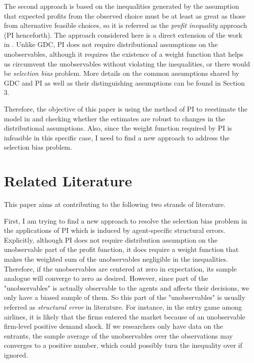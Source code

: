 \documentclass[a4paper]{article}
\begin{document}
The second approach is based on the inequalities generated by the assumption that expected profits from the observed choice must be at least as great as those from alternative feasible choices, so it is referred as the \textit{profit inequality} approach (PI henceforth). The approach considered here is a direct extension of the work in \cite{pakes2015moment}. Unlike GDC, PI does not require distributional assumptions on the unobservables, although it requires the existence of a weight function that helps us circumvent the unobservables without violating the inequalities, or there would be \textit{selection bias} problem. More details on the common assumptions shared by GDC and PI as well as their distinguishing assumptions can be found in Section 3. 

Therefore, the objective of this paper is using the method of PI to reestimate the model in \cite{ciliberto2009market} and checking whether the estimates are robust to changes in the distributional assumptions. Also, since the weight function required by PI is infeasible in this specific case, I need to find a new approach to address the selection bias problem.

\section{Related Literature}

This paper aims at contributing to the following two strands of literature.

First, I am trying to find a new approach to resolve the selection bias problem in the applications of PI which is induced by agent-specific structural errors. Explicitly, although PI does not require distribution assumption on the unobservable part of the profit function, it does require a weight function that makes the weighted sum of the unobservables negligible in the inequalities. Therefore, if the unobservables are centered at zero in expectation, its sample analogue will converge to zero as desired. However, since part of the "unobservables" is actually observable to the agents and affects their decisions, we only have a biased sample of them. So this part of the "unobservables" is usually referred as \textit{structural error} in literature. For instance, in the entry game among airlines, it is likely that the firms entered the market because of an unobservable firm-level positive demand shock. If we researchers only have data on the entrants, the sample average of the unobservables over the observations may converges to a positive number, which could possibly turn the inequality over if ignored. 
\end{document}

